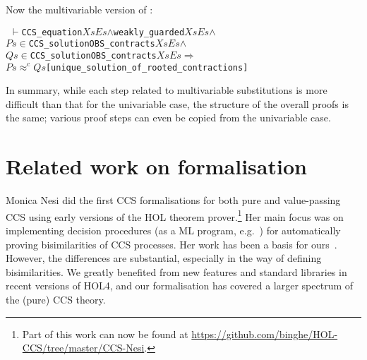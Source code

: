 \documentclass[GCNS]{yincog}
\renewcommand{\HOLConst}[1]{\texttt{#1}}
\renewcommand{\HOLFreeVar}[1]{\ensuremath{\mathit{#1}}}
\renewcommand{\HOLSymConst}[1]{#1}
\renewcommand{\HOLTokenConj}{\ensuremath{\wedge}}
\renewcommand{\HOLTokenIn}{\ensuremath{\in}}
\renewcommand{\HOLTokenTurnstile}{\ensuremath{\:\:\vdash}}
\theoremstyle{remark}
\theoremstyle{theorem}
\theoremstyle{remark}
\newcommand{\HOLTokenObsCongr}{$\approx^{\mathrm{c}}\!$}
\renewcommand{\HOLTokenImp}{\ensuremath{\Longrightarrow}}
\newcommand{\univariate}{univariable\xspace}
\newcommand{\multivariate}{multivariable\xspace}
\begin{document}
Now the \multivariate version of :
%
\begin{alltt}
\HOLTokenTurnstile{} \HOLConst{CCS\_equation} \HOLFreeVar{Xs} \HOLFreeVar{Es} \HOLSymConst{\HOLTokenConj{}} \HOLConst{weakly\_guarded} \HOLFreeVar{Xs} \HOLFreeVar{Es} \HOLSymConst{\HOLTokenConj{}}
   \HOLFreeVar{Ps} \HOLSymConst{\HOLTokenIn{}} \HOLConst{CCS\_solution} \HOLConst{OBS\_contracts} \HOLFreeVar{Xs} \HOLFreeVar{Es} \HOLSymConst{\HOLTokenConj{}}
   \HOLFreeVar{Qs} \HOLSymConst{\HOLTokenIn{}} \HOLConst{CCS\_solution} \HOLConst{OBS\_contracts} \HOLFreeVar{Xs} \HOLFreeVar{Es} \HOLSymConst{\HOLTokenImp{}}
   \HOLFreeVar{Ps} \HOLSymConst{\HOLTokenObsCongr} \HOLFreeVar{Qs}\hfill{[unique\_solution\_of\_rooted\_contractions]}
\end{alltt}
%
In summary, while each step related to \multivariate substitutions is more
difficult than that for the \univariate case, the structure of the overall
proofs is the same; various proof steps can even be copied from the
\univariate case.

\section{Related work on formalisation}
 \label{s:rel}

Monica Nesi did the first CCS formalisations for both pure and value-passing
CCS \cite{Nesi:1992ve,Nesi:2017wo} using early versions of the HOL theorem
prover.\footnote{Part of this work can now be found at
\url{https://github.com/binghe/HOL-CCS/tree/master/CCS-Nesi}.} Her main
focus was on implementing decision procedures (as a ML program, e.g.~\cite{cleaveland1993concurrency})
for automatically proving bisimilarities of CCS processes. Her work has
been a basis for ours~\cite{Tian:2017wrba}. However, the differences are
substantial, especially in the way of defining bisimilarities. We greatly
benefited from new features and standard libraries in recent versions of
HOL4, and our formalisation has covered a larger spectrum of the (pure)
CCS theory.
\end{document}
